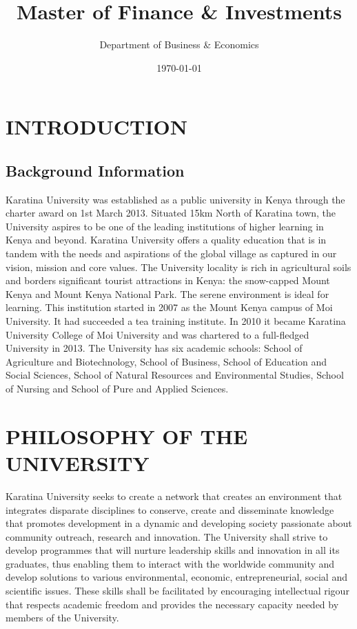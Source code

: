 \documentclass[16,a4paperpaper,]{article}
\title{Master of Finance \& Investments}
\author{Department of Business \& Economics}
\date{\today}
\begin{document}
\renewcommand{\contentsname}{Contents}

\renewcommand{\pagename}{Page}


\maketitle
\tableofcontents
{}
\clearpage

\section{INTRODUCTION}

\subsection{Background Information}

Karatina University was established as a public university in Kenya
through the charter award on 1st March 2013. Situated 15km North of
Karatina town, the University aspires to be one of the leading
institutions of higher learning in Kenya and beyond. Karatina University
offers a quality education that is in tandem with the needs and
aspirations of the global village as captured in our vision, mission and
core values. The University locality is rich in agricultural soils and
borders significant tourist attractions in Kenya: the snow-capped Mount
Kenya and Mount Kenya National Park. The serene environment is ideal for
learning. This institution started in 2007 as the Mount Kenya campus of
Moi University. It had succeeded a tea training institute. In 2010 it
became Karatina University College of Moi University and was chartered
to a full-fledged University in 2013. The University has six academic
schools: School of Agriculture and Biotechnology, School of Business,
School of Education and Social Sciences, School of Natural Resources and
Environmental Studies, School of Nursing and School of Pure and Applied
Sciences.

\section{PHILOSOPHY OF THE UNIVERSITY}

Karatina University seeks to create a network that creates an
environment that integrates disparate disciplines to conserve, create
and disseminate knowledge that promotes development in a dynamic and
developing society passionate about community outreach, research and
innovation. The University shall strive to develop programmes that will
nurture leadership skills and innovation in all its graduates, thus
enabling them to interact with the worldwide community and develop
solutions to various environmental, economic, entrepreneurial, social
and scientific issues. These skills shall be facilitated by encouraging
intellectual rigour that respects academic freedom and provides the
necessary capacity needed by members of the University.
\end{document}
